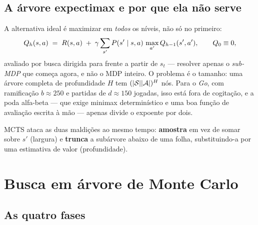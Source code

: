 \documentclass[a4paper, 11pt]{article}
\begin{document}
\subsection{A árvore expectimax e por que ela não serve}

A alternativa ideal é maximizar em \emph{todos} os níveis, não só no primeiro:
\[
  Q_h(s,a) \;=\; R(s,a) \;+\; \gamma \sum_{s'} P(s'\mid s,a)\,
  \max_{a'} Q_{h-1}(s',a'), \qquad Q_0 \equiv 0,
\]
avaliado por busca dirigida para frente a partir de $s_t$ --- resolver apenas o
\emph{sub-MDP} que começa agora, e não o MDP inteiro. O problema é o tamanho:
uma árvore completa de profundidade $H$ tem $(\lvert\mathcal{S}\rvert\lvert\mathcal{A}\rvert)^H$ nós. Para o
\emph{Go}, com ramificação $b\approx 250$ e partidas de $d\approx 150$ jogadas,
isso está fora de cogitação, e a poda alfa-beta --- que exige minimax
determinístico e uma boa função de avaliação escrita à mão --- apenas divide o
expoente por dois.

\begin{ideiabox}
MCTS ataca as duas maldições ao mesmo tempo: \textbf{amostra} em vez de somar
sobre $s'$ (largura) e \textbf{trunca} a subárvore abaixo de uma folha,
substituindo-a por uma estimativa de valor (profundidade).
\end{ideiabox}

\section{Busca em árvore de Monte Carlo}

\subsection{As quatro fases}
\end{document}
